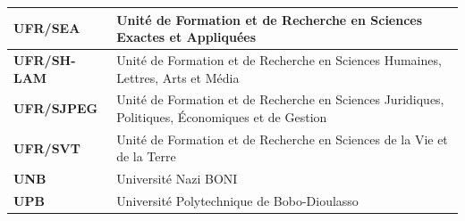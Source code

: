 \begin{longtable}{|>{\centering\arraybackslash}p{4cm}|p{10cm}|}
	\hline
	\textbf{UFR/SEA} & Unité de Formation et de Recherche en Sciences Exactes et Appliquées \\
	\hline
	\textbf{UFR/SH-LAM} & Unité de Formation et de Recherche en Sciences Humaines, Lettres, Arts et Média \\
	\hline
	\textbf{UFR/SJPEG} & Unité de Formation et de Recherche en Sciences Juridiques, Politiques, Économiques et de Gestion \\
	\hline
	\textbf{UFR/SVT} & Unité de Formation et de Recherche en Sciences de la Vie et de la Terre \\
	\hline
	\textbf{UNB} & Université Nazi BONI \\
	\hline
	\textbf{UPB} & Université Polytechnique de Bobo-Dioulasso \\
	\hline
	
\end{longtable}

\clearpage